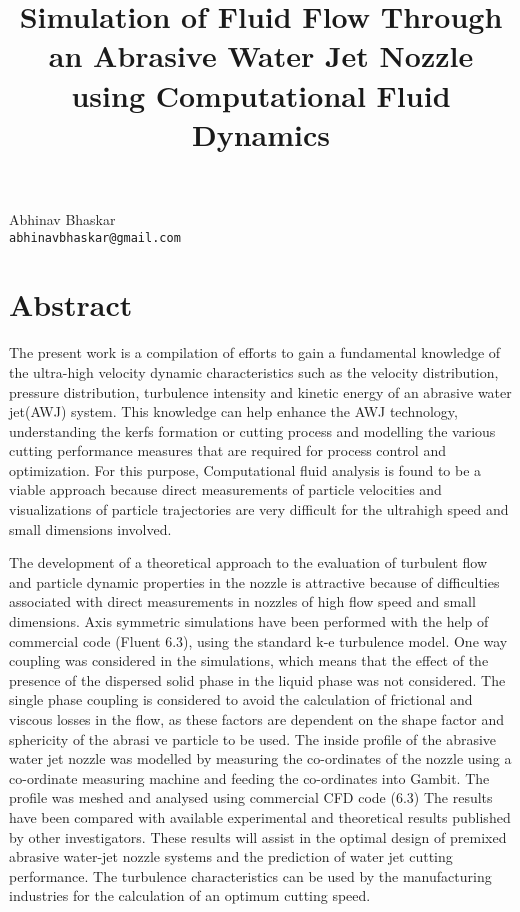 \title{Simulation of Fluid Flow Through an Abrasive Water Jet Nozzle using Computational Fluid Dynamics}
\author{} \institute{}
\maketitle

\begin{center}
{\large Abhinav Bhaskar}\\
{\tt abhinavbhaskar@gmail.com}
\end{center}

\section*{Abstract}
The present work is a compilation of efforts to gain a fundamental knowledge of the ultra-high velocity dynamic characteristics such as the velocity distribution, pressure distribution, turbulence intensity and kinetic energy of an abrasive water jet(AWJ) system. This knowledge can help enhance the AWJ technology, understanding the kerfs formation or cutting process and modelling the various cutting performance measures that are required for process control and optimization. For this purpose, Computational fluid analysis is found to be a viable approach because direct measurements of particle velocities and visualizations of particle trajectories are very difficult for the ultrahigh speed and small dimensions involved.

The development of a theoretical approach to the evaluation of turbulent flow and particle dynamic properties in the nozzle is attractive because of difficulties associated with direct measurements in nozzles of high flow speed and small dimensions. Axis symmetric simulations have been performed with the help of commercial code (Fluent 6.3), using the standard k-e turbulence model. One way coupling was considered in the simulations, which means that the effect of the presence of the dispersed solid phase in the liquid phase was not considered. The single phase coupling is considered to avoid the calculation of frictional and viscous losses in the flow, as these factors are dependent on the shape factor and sphericity of the abrasi ve particle to be used. The inside profile of the abrasive water jet nozzle was modelled by measuring the co-ordinates of the nozzle using a co-ordinate measuring machine and feeding the co-ordinates into Gambit. The profile was meshed and analysed using commercial CFD code (6.3) The results have been compared with available experimental and theoretical results published by other investigators. These results will assist in the optimal design of premixed abrasive water-jet nozzle systems and the prediction of water jet cutting performance. The turbulence characteristics can be used by the manufacturing industries for the calculation of an optimum cutting speed.